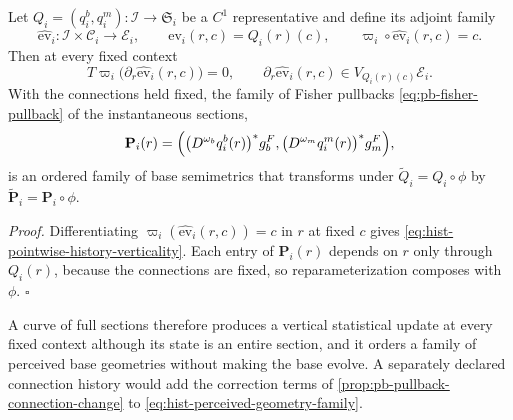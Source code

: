 Let \(Q_i=(q^b_i,q^m_i):\mathscr I\to\mathfrak S_i\) be a \(C^1\)
representative and define its adjoint family
\begin{equation}
\widehat{\mathrm{ev}}_i:\mathscr I\times\mathcal C_i\longrightarrow\mathcal E_i,
\qquad
\widehat{\mathrm{ev}}_i(r,c)=Q_i(r)(c),
\qquad
\varpi_i\circ\widehat{\mathrm{ev}}_i(r,c)=c.
\label{eq:hist-adjoint-section-family}
\end{equation}
Then at every fixed context
\begin{equation}
T\varpi_i\bigl(\partial_r\widehat{\mathrm{ev}}_i(r,c)\bigr)=0,
\qquad
\partial_r\widehat{\mathrm{ev}}_i(r,c)
\in V_{Q_i(r)(c)}\mathcal E_i.
\label{eq:hist-pointwise-history-verticality}
\end{equation}
With the connections held fixed, the family of Fisher pullbacks
\eqref{eq:pb-fisher-pullback} of the instantaneous sections,
\begin{equation}
\mathbf P_i(r)
=\Bigl(
\bigl(D^{\omega_b}q^b_i(r)\bigr)^*g^F_b,
\bigl(D^{\omega_m}q^m_i(r)\bigr)^*g^F_m
\Bigr),
\label{eq:hist-perceived-geometry-family}
\end{equation}
is an ordered family of base semimetrics that transforms under
\(\widetilde Q_i=Q_i\circ\phi\) by \(\widetilde{\mathbf P}_i=\mathbf P_i\circ\phi\).

\noindent\emph{Proof.}
Differentiating \(\varpi_i(\widehat{\mathrm{ev}}_i(r,c))=c\) in \(r\) at fixed
\(c\) gives \eqref{eq:hist-pointwise-history-verticality}. Each entry of
\(\mathbf P_i(r)\) depends on \(r\) only through \(Q_i(r)\), because the
connections are fixed, so reparameterization composes with \(\phi\). \(\square\)

A curve of full sections therefore produces a vertical statistical update at
every fixed context although its state is an entire section, and it orders a
family of perceived base geometries without making the base evolve. A
separately declared connection history would add the correction terms of
\cref{prop:pb-pullback-connection-change} to \eqref{eq:hist-perceived-geometry-family}.

